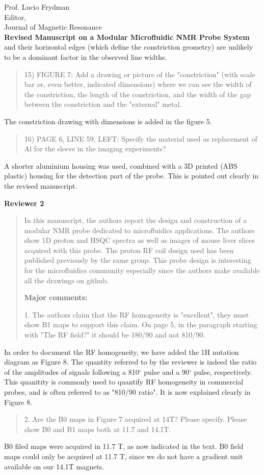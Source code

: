 \documentclass{mu-soton-letter}
\newenvironment{reviewer} {\begin{quote}\color{black!50}} {\end{quote}}
\begin{document}
\begin{letter}{Prof. Lucio Frydman\\
  Editor,\\
  Journal of Magnetic Resonance\\[2cm]
  \textbf{Revised Manuscript on a Modular Microfluidic NMR Probe System}}
and their horizontal edges (which define the constriction geometry) are unlikely
to be a dominant factor in the observed line widths.
\begin{reviewer}
15) FIGURE 7: Add a drawing or picture of the "constriction" (with scale bar or, even better, indicated dimensions) where we can see the width of the constriction, the length of the constriction, and the width of the gap between the constriction and the "external" metal.
\end{reviewer}
The constriction drawing with dimensions is added in the figure 5.
\begin{reviewer}
16) PAGE 6, LINE 59, LEFT: Specify the material used as replacement of Al for the sleeve in the imaging experiments?
\end{reviewer}
A shorter aluminium housing was used, combined with a 3D printed (ABS plastic)
housing for the detection part of the probe. This is pointed out clearly in the
revised manuscript.

\clearpage
\textbf{Reviewer 2}

\begin{reviewer}
  {In this manuscript, the authors report the design and construction of a modular NMR probe dedicated to microfluidics applications.  The authors show 1D proton and HSQC spectra as well as images of mouse liver slices acquired with this probe. The proton RF coil design used has been published previously by the same group. This probe design is interesting for the microfluidics community especially since the authors make available all the drawings on github.}

  \textbf{Major comments:}

1.      The authors claim that the RF homogeneity is "excellent", they must show B1 maps to support this claim.  On page 5, in the paragraph starting with "The RF field?" it should be 180/90 and not 810/90.
\end{reviewer}
In order to document the RF homogeneity, we have added the 1H nutation diagram
as Figure 8. The quantity referred to by the reviewer is indeed the ratio of the
amplitudes of signals following a 810$^\circ$ pulse and a 90$^\circ$ pulse, respectively.
This quanitity is commonly used to quantify RF homogeneity in commercial probes,
and is often referred to as "810/90 ratio". It is now explained clearly in Figure 8.
\begin{reviewer}
2.      Are the B0 maps in Figure 7 acquired at 14T?  Please specify. Please show B0 and B1 maps both at 11.7 and 14.1T.
\end{reviewer}
B0 filed maps were acquired in 11.7 T, as now indicated in the text. B0 field maps could
 only be acquired at 11.7 T, since we do not have a gradient unit available on
 our 14.1T magnets.



\end{letter}
\end{document}
